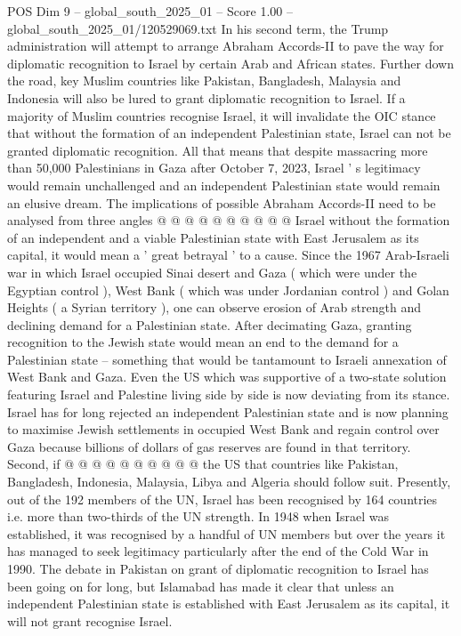 \begin{textsample}{POS Dim 9 – global\_south\_2025\_01 – Score 1.00 – global\_south\_2025\_01/120529069.txt}
In his second term, the Trump administration will attempt to arrange Abraham Accords-II to pave the way for diplomatic recognition to Israel by certain Arab and African states.
Further down the road, key Muslim countries like Pakistan, Bangladesh, Malaysia and Indonesia will also be lured to grant diplomatic recognition to Israel.
If a majority of Muslim countries recognise Israel, it will invalidate the OIC stance that without the formation of an independent Palestinian state, Israel can not be granted diplomatic recognition.
All that means that despite massacring more than 50,000 Palestinians in Gaza after October 7, 2023, Israel ' s legitimacy would remain unchallenged and an independent Palestinian state would remain an elusive dream.
The implications of possible Abraham Accords-II need to be analysed from three angles @ @ @ @ @ @ @ @ @ @ Israel without the formation of an independent and a viable Palestinian state with East Jerusalem as its capital, it would mean a ' great betrayal ' to a cause.
Since the 1967 Arab-Israeli war in which Israel occupied Sinai desert and Gaza ( which were under the Egyptian control ), West Bank ( which was under Jordanian control ) and Golan Heights ( a Syrian territory ), one can observe erosion of Arab strength and declining demand for a Palestinian state.
After decimating Gaza, granting recognition to the Jewish state would mean an end to the demand for a Palestinian state -- something that would be tantamount to Israeli annexation of West Bank and Gaza.
Even the US which was supportive of a two-state solution featuring Israel and Palestine living side by side is now deviating from its stance.
Israel has for long rejected an independent Palestinian state and is now planning to maximise Jewish settlements in occupied West Bank and regain control over Gaza because billions of dollars of gas reserves are found in that territory.
Second, if @ @ @ @ @ @ @ @ @ @ the US that countries like Pakistan, Bangladesh, Indonesia, Malaysia, Libya and Algeria should follow suit.
Presently, out of the 192 members of the UN, Israel has been recognised by 164 countries i.e. more than two-thirds of the UN strength.
In 1948 when Israel was established, it was recognised by a handful of UN members but over the years it has managed to seek legitimacy particularly after the end of the Cold War in 1990.
The debate in Pakistan on grant of diplomatic recognition to Israel has been going on for long, but Islamabad has made it clear that unless an independent Palestinian state is established with East Jerusalem as its capital, it will not grant recognise Israel.

\end{textsample}
